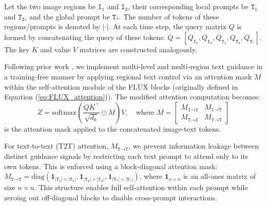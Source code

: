 \documentclass{article}
\newcommand{\kc}[1]{\textcolor{blue}{#1}}
\begin{document}

Let the two image regions be $\texttt{I}_\texttt{1}$ and $\texttt{I}_\texttt{2}$, their corresponding local prompts be $\texttt{T}_\texttt{1}$ and $\texttt{T}_\texttt{2}$, and the global prompt be $\texttt{T}_\texttt{*}$. The number of tokens of these regions/prompts is denoted by $|\cdot|$. At each time step, the query matrix $Q$ is formed by concatenating the query of these tokens: $ Q= [Q_{\texttt{I}_\texttt{1}}, Q_{\texttt{I}_\texttt{2}}, Q_{\texttt{T}_\texttt{1}}, Q_{\texttt{T}_\texttt{2}}, Q_{\texttt{T}_\texttt{*}}]$. The key $K$ and value $V$ matrices are constructed analogously.

Following prior work \citep{chen2024training}, we implement multi-level and multi-region text guidance in a training-free manner by applying regional text control via an attention mask $M$ within the self-attention module of the FLUX blocks (originally defined in Equation (\ref{eq:FLUX_attention})). The modified attention computation becomes:
\begin{equation}
Z = \mathrm{softmax}\left(\frac{QK^\top}{\sqrt{d_k}} \odot M\right)V, \quad\text{where }M = \begin{bmatrix}
        M_{\texttt{I}\to\texttt{I}} &  M_{\texttt{I}\to\texttt{T}} \\
        M_{\texttt{T}\to\texttt{I}} &  M_{\texttt{T}\to\texttt{T}}
    \end{bmatrix}
\label{eq:masked_attention}
\end{equation}
is the attention mask applied to the concatenated image-text tokens.
    
For text-to-text (T2T) attention, $M_{\texttt{T}\to\texttt{T}}$, we prevent information leakage between distinct guidance signals by restricting each text prompt to attend only to its own tokens. This is enforced using a block-diagonal attention mask: $M_{\texttt{T}\to\texttt{T}}=\mathrm{diag}(\mathbf{1}_{|\texttt{T}_\texttt{1}| \times |\texttt{T}_\texttt{1}|}, \mathbf{1}_{|\texttt{T}_\texttt{2}| \times |\texttt{T}_\texttt{2}|},\mathbf{1}_{|\texttt{T}_\texttt{*}| \times|\texttt{T}_\texttt{*}|})$, where $\mathbf{1}_{n \times n}$ is an all-ones matrix of size $n \times n$. This structure enables full self-attention within each prompt while zeroing out off-diagonal blocks to disable cross-prompt interactions.
\end{document}

